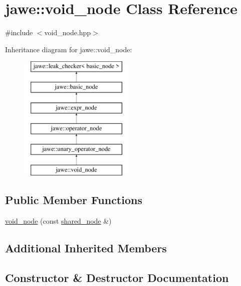 \hypertarget{classjawe_1_1void__node}{}\section{jawe\+:\+:void\+\_\+node Class Reference}
\label{classjawe_1_1void__node}


{\ttfamily \#include $<$void\+\_\+node.\+hpp$>$}

Inheritance diagram for jawe\+:\+:void\+\_\+node\+:\begin{figure}[H]
\begin{center}
\leavevmode
\includegraphics[height=6.000000cm]{classjawe_1_1void__node}
\end{center}
\end{figure}
\subsection*{Public Member Functions}
\begin{DoxyCompactItemize}
\item 
\hyperlink{classjawe_1_1void__node_a359dd01a1dd7ba295d47915da303e75e}{void\+\_\+node} (const \hyperlink{namespacejawe_a3f307481d921b6cbb50cc8511fc2b544}{shared\+\_\+node} \&)
\end{DoxyCompactItemize}
\subsection*{Additional Inherited Members}


\subsection{Constructor \& Destructor Documentation}
\mbox{\label{classjawe_1_1void__node_a359dd01a1dd7ba295d47915da303e75e}} 
